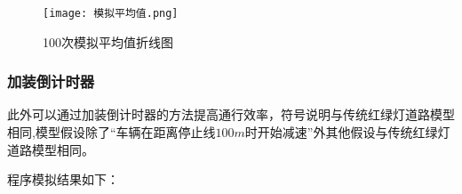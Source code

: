 \documentclass[a4paper,12pt]{article}
\numberwithin{equation}{section}
\begin{document}
	\begin{figure}[H]
		\centering
		\texttt{[image: 模拟平均值.png]}
		\caption{100次模拟平均值折线图}
		\label{100mo}
\end{figure}
	\subsubsection{加装倒计时器}
	此外可以通过加装倒计时器的方法提高通行效率，符号说明与传统红绿灯道路模型相同,模型假设除了“车辆在距离停止线$100m$时开始减速”外其他假设与传统红绿灯道路模型相同。\par
	程序模拟结果如下：
\end{document}

